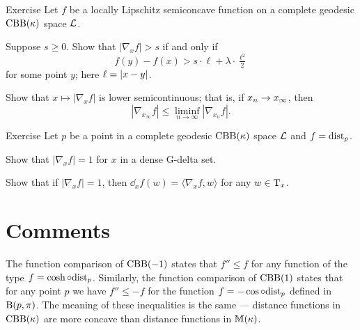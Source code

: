 \begin{thm}{Exercise}\label{ex:semicontinuous-grad}
Let $f$ be a locally Lipschitz semiconcave function on a complete geodesic $\mathrm{CBB}(\kappa)$ space $\mathcal{L}$.

\begin{subthm}{}
Suppose $s\ge 0$.
Show that $|\nabla_xf|> s$ if and only if  
\[f(y)-f(x)>s\cdot \ell+\lambda\cdot \tfrac{\ell^2}2\]
for some point $y$; here $\ell=\dist{x}{y}{}$.
\end{subthm}

\begin{subthm}{} Show that $x\mapsto|\nabla_xf|$ is lower semicontinuous;
that is, if $x_n\z\to x_\infty$, then
\[|\nabla_{x_\infty}f|\le \liminf_{n\to\infty} |\nabla_{x_n}f|.\]
\end{subthm}

\end{thm}

\begin{thm}{Exercise}\label{ex:grad-dist}
Let $p$ be a point in a complete geodesic $\mathrm{CBB}(\kappa)$ space $\mathcal{L}$ and $f=\mathrm{dist}_p$.

\begin{subthm}{}
Show that $|\nabla_xf|=1$
for $x$ in a dense G-delta set.
\end{subthm}

\begin{subthm}{}
Show that if $|\nabla_xf|=1$, then $\dd_xf(w)= \langle\nabla_xf,w\rangle$ for any $w\in \mathrm{T}_x$.
\end{subthm}


\end{thm}

\section{Comments}

The function comparison of $\mathrm{CBB}(-1)$ states that 
$f''\le f$ for any function of the type $f=\cosh\circ\mathrm{dist}_p$.
Similarly, the function comparison of $\mathrm{CBB}(1)$ states that for any point $p$ we have
$f''\le -f$ for the function $f=-\cos\circ\mathrm{dist}_p$
defined in $\mathrm{B}{}(p,\pi)$.
The meaning of these inequalities is the same --- distance functions in $\mathrm{CBB}(\kappa)$ are more concave than distance functions in $\mathbb{M}(\kappa)$.
